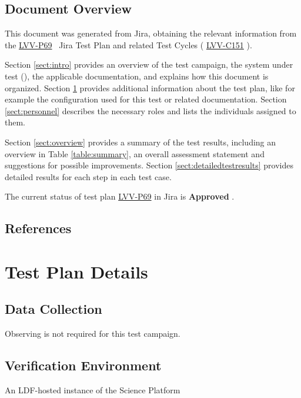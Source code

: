 \documentclass[DM,lsstdraft,STR,toc]{lsstdoc}
\begin{document}
\subsection{Document Overview}
\label{sect:docoverview}

This document was generated from Jira, obtaining the relevant information from the
\href{https://jira.lsstcorp.org/secure/Tests.jspa\#/testPlan/LVV-P69}{LVV-P69}
~Jira Test Plan and related Test Cycles (
\href{https://jira.lsstcorp.org/secure/Tests.jspa\#/testCycle/LVV-C151}{LVV-C151}
).

Section \ref{sect:intro} provides an overview of the test campaign, the system under test (\product{}),
the applicable documentation, and explains how this document is organized.
Section \ref{sect:testplan} provides additional information about the test plan, like for example the configuration
used for this test or related documentation.
Section \ref{sect:personnel} describes the necessary roles and lists the individuals assigned to them.

Section \ref{sect:overview} provides a summary of the test results, including an overview in Table \ref{table:summary},
an overall assessment statement and suggestions for possible improvements.
Section \ref{sect:detailedtestresults} provides detailed results for each step in each test case.

The current status of test plan \href{https://jira.lsstcorp.org/secure/Tests.jspa\#/testPlan/LVV-P69}{LVV-P69} in Jira is \textbf{ Approved }.

\subsection{References}
\label{sect:references}
\renewcommand{\refname}{}



\newpage
\section{Test Plan Details}
\label{sect:testplan}


\subsection{Data Collection}

  Observing is not required for this test campaign.

\subsection{Verification Environment}
\label{sect:hwconf}
  An LDF-hosted instance of the Science Platform
\end{document}
